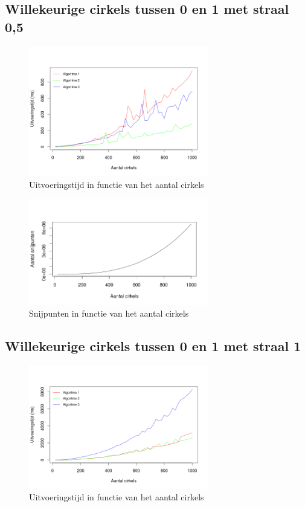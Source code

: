 \documentclass[11pt,a4paper]{article}
\begin{document}
\subsection{Willekeurige cirkels tussen 0 en 1 met straal 0,5}
\begin{figure}[H]
\centering
\includegraphics[width=0.7\textwidth]{uitvoeringstijd_05.png}
\caption*{Uitvoeringstijd in functie van het aantal cirkels}
\end{figure}

\begin{figure}[H]
\centering
\includegraphics[width=0.7\textwidth]{snijpunten_05.png}
\caption*{Snijpunten in functie van het aantal cirkels}
\end{figure}

\subsection{Willekeurige cirkels tussen 0 en 1 met straal 1}
\begin{figure}[H]
\centering
\includegraphics[width=0.7\textwidth]{uitvoeringstijd_10.png}
\caption*{Uitvoeringstijd in functie van het aantal cirkels}
\end{figure}
\end{document}
